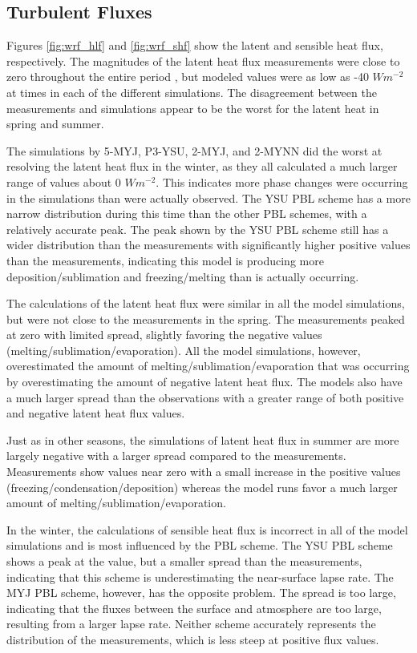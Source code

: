 \subsection{Turbulent Fluxes}
Figures \ref{fig:wrf_hlf} and \ref{fig:wrf_shf} show the latent and sensible heat flux, respectively. The magnitudes of the latent heat flux measurements were close to zero throughout the entire period \cite{walden:2017}, but modeled values were as low as -40 $Wm^{-2}$ at times in each of the different simulations. The disagreement between the measurements and simulations appear to be the worst for the latent heat in spring and summer. 

The simulations by 5-MYJ, P3-YSU, 2-MYJ, and 2-MYNN did the worst at resolving the latent heat flux in the winter, as they all calculated a much larger range of values about 0 $Wm^{-2}$. This indicates more phase changes were occurring in the simulations than were actually observed. The YSU PBL scheme has a more narrow distribution during this time than the other PBL schemes, with a relatively accurate peak. The peak shown by the YSU PBL scheme still has a wider distribution than the measurements with significantly higher positive values than the measurements, indicating this model is producing more deposition/sublimation and freezing/melting than is actually occurring.

The calculations of the latent heat flux were similar in all the model simulations, but were not close to the measurements in the spring. The measurements peaked at zero with limited spread, slightly favoring the negative values (melting/sublimation/evaporation). All the model simulations, however, overestimated the amount of melting/sublimation/evaporation that was occurring by overestimating the amount of negative latent heat flux. The models also have a much larger spread than the observations with a greater range of both positive and negative latent heat flux values.

Just as in other seasons, the simulations of latent heat flux in summer are more largely negative with a larger spread compared to the measurements. Measurements show values near zero with a small increase in the positive values (freezing/condensation/deposition) whereas the model runs favor a much larger amount of melting/sublimation/evaporation.

In the winter, the calculations of sensible heat flux is incorrect in all of the model simulations and is most influenced by the PBL scheme. The YSU PBL scheme shows a peak at the value, but a smaller spread than the measurements, indicating that this scheme is underestimating the near-surface lapse rate. The MYJ PBL scheme, however, has the opposite problem. The spread is too large, indicating that the fluxes between the surface and atmosphere are too large, resulting from a larger lapse rate. Neither scheme accurately represents the distribution of the measurements, which is less steep at positive flux values.

